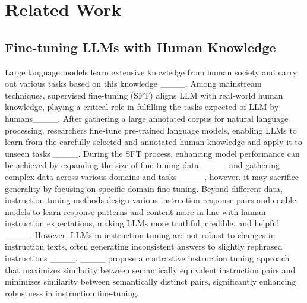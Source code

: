 \section{Related Work}
\subsection{Fine-tuning LLMs with Human Knowledge}
Large language models learn extensive knowledge from human society and carry out various tasks based on this knowledge ____. Among mainstream techniques, supervised fine-tuning (SFT) aligns LLM with real-world human knowledge, playing a critical role in fulfilling the tasks expected of LLM by humans____. After gathering a large annotated corpus for natural language processing, researchers fine-tune pre-trained language models, enabling LLMs to learn from the carefully selected and annotated human knowledge and apply it to unseen tasks ____. During the SFT process, enhancing model performance can be achieved by expanding the size of fine-tuning data ____ and gathering complex data across various domains and tasks ____, however, it may sacrifice generality by focusing on specific domain fine-tuning. Beyond different data, instruction tuning methods design various instruction-response pairs and enable models to learn response patterns and content more in line with human instruction expectations, making LLMs more truthful, credible, and helpful ____. However, LLMs in instruction tuning are not robust to changes in instruction texts, often generating inconsistent answers to slightly rephrased instructions ____. ____ propose a contrastive instruction tuning approach that maximizes similarity between semantically equivalent instruction pairs and minimizes similarity between semantically distinct pairs, significantly enhancing robustness in instruction fine-tuning.

